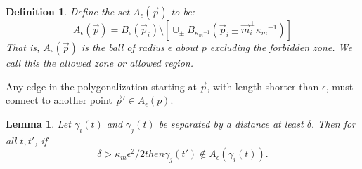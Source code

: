 \documentclass{article}
\newtheorem{definition}[cntr]{Definition}
\newcommand{\nin}{\not\in}
\newtheorem{lemma}[cntr]{Lemma}
\numberwithin{cntr}{section}
\numberwithin{equation}{section}
\newcommand{\vp}[0]{{\vec{p}}}
\newcommand{\vm}[0]{{\vec{m}}}
\newcommand{\ball}[2]{ { B_{#1}(#2) } }
\newcommand{\allowed}[2]{ { A_{#1}(#2) } }
\newcommand{\kmax}{{\kappa_{m}}}
\newcommand{\kmaxi}{{\kmax^{-1}}}
\begin{document}
\begin{definition}
  Define the set $\allowed{\epsilon}{\vp}$ to be:
  \begin{equation}
    \label{eq:allowedRegion}
    \allowed{\epsilon}{\vp}=\ball{\epsilon}{\vp_{i}} \setminus \left[ \cup_{\pm} \ball{\kmaxi}{\vp_{i} \pm \vm_{i}^{\perp} \kmaxi} \right]
  \end{equation}
  That is, $\allowed{\epsilon}{\vp}$ is the ball of radius $\epsilon$ about $p$ excluding the forbidden zone.  We call this the \emph{allowed zone} or \emph{allowed region}.
\end{definition}
Any edge in the polygonalization starting at $\vp$, with length shorter than $\epsilon$, must connect to another point $\vp' \in \allowed{\epsilon}{p}$.

\begin{lemma}
  Let $\gamma_{i}(t)$ and $\gamma_{j}(t)$ be separated by a distance at least $\delta$. Then for all $t, t'$, if
  \begin{subequations}
    \label{eq:separationCondition}
    \begin{equation}
      \delta > \kmax \epsilon^{2}/2
    \end{equation}
    then
    \begin{equation}
      \gamma_{j}(t')  \nin  \allowed{\epsilon}{\gamma_{i}(t)}.
    \end{equation}
  \end{subequations}
\end{lemma}
\end{document}
